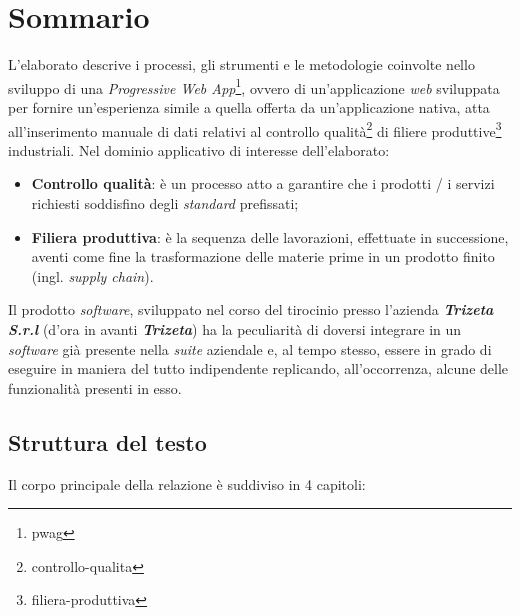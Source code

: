 \cleardoublepage
{}
{}
\begingroup
\let\clearpage\relax
\let\cleardoublepage\relax
\let\cleardoublepage\relax

\chapter*{Sommario}
L'elaborato descrive i processi, gli strumenti e le metodologie coinvolte nello sviluppo di una \textit{Progressive Web App}\footnote{\gls{pwag}}, ovvero di un'applicazione \textit{web} sviluppata per fornire un'esperienza simile a quella offerta da un'applicazione nativa, 
atta all'inserimento manuale di dati relativi al controllo qualità\footnote{\gls{controllo-qualita}} di filiere produttive\footnote{\gls{filiera-produttiva}} industriali. 
\newline
Nel dominio applicativo di interesse dell'elaborato:
\begin{itemize}
    \item \textbf{Controllo qualità}: è un processo atto a garantire che i prodotti / i servizi richiesti soddisfino degli \textit{standard} prefissati;
    \item \textbf{Filiera produttiva}: è la sequenza delle lavorazioni, effettuate in successione, aventi come fine la trasformazione delle materie prime in un prodotto finito (ingl. \textit{supply chain}).
\end{itemize} 
Il prodotto \textit{software}, sviluppato nel corso del tirocinio presso l'azienda \textit{\textbf{Trizeta S.r.l}} (d'ora in avanti \textit{\textbf{Trizeta}}) ha la peculiarità di doversi integrare in un \textit{software} già presente nella \textit{suite} aziendale e, al tempo stesso, essere in grado di eseguire in maniera del tutto indipendente replicando, all'occorrenza, alcune delle funzionalità presenti in esso.

\section*{Struttura del testo}
Il corpo principale della relazione è suddiviso in 4 capitoli:

